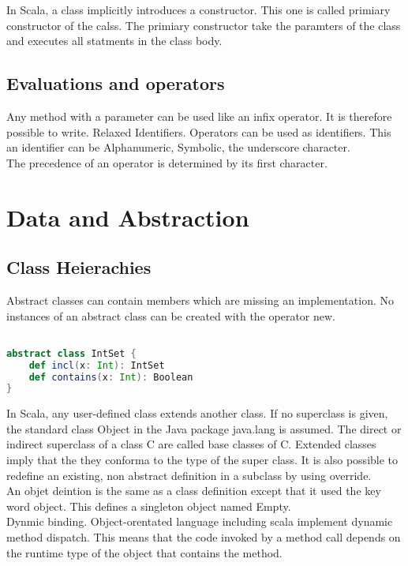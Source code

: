 \documentclass[10pt, a4paper]{report}
\begin{document}
In Scala, a class implicitly introduces a constructor. This one is called primiary constructor of the calss. The primiary constructor take the paramters of the class and executes all statments in the class body.

\section{Evaluations and operators}

Any method with a parameter can be used like an infix operator. It is therefore possible to write. Relaxed Identifiers. Operators can be used as identifiers. This an identifier can be Alphanumeric, Symbolic, the underscore character.\\

The precedence of an operator is determined by its first character.

\chapter{Data and Abstraction}

\section{Class Heierachies}

Abstract classes can contain members which are missing an implementation. No instances of an abstract class can be created with the operator new.

\begin{lstlisting}[language=scala]

abstract class IntSet {
	def incl(x: Int): IntSet
	def contains(x: Int): Boolean
}

\end{lstlisting}

In Scala, any user-defined class extends another class. If no superclass is given, the standard class Object in the Java package java.lang is assumed. The direct or indirect superclass of a class C are called base classes of C. Extended classes imply that the they conforma to the type of the super class. It is also possible to redefine an existing, non abstract definition in a subclass by using override.\\ An objet deintion is the same as a class definition except that it used the key word object. This defines a singleton object named Empty.\\ Dynmic binding. Object-orentated language including scala implement dynamic method dispatch. This means that the code invoked by a method call depends on the runtime type of the object that contains the method.
\end{document}
